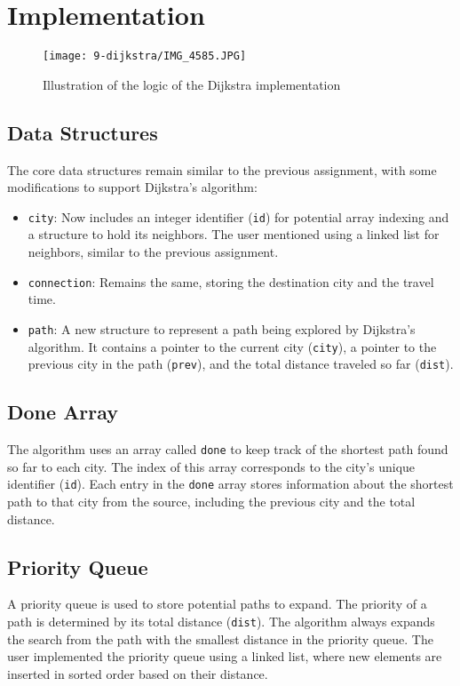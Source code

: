\documentclass[a4paper,11pt]{article}
\begin{document}
\section*{Implementation}
\begin{figure}
    \centering
    \texttt{[image: 9-dijkstra/IMG\_4585.JPG]}
    \caption{Illustration of the logic of the Dijkstra implementation}
    \label{fig:dijkstra}
\end{figure}
\subsection*{Data Structures}
The core data structures remain similar to the previous assignment, with some modifications to support Dijkstra's algorithm:

\begin{itemize}
    \item \texttt{city}: Now includes an integer identifier (\texttt{id}) for potential array indexing and a structure to hold its neighbors. The user mentioned using a linked list for neighbors, similar to the previous assignment.
    \item \texttt{connection}: Remains the same, storing the destination city and the travel time.
    \item \texttt{path}: A new structure to represent a path being explored by Dijkstra's algorithm. It contains a pointer to the current city (\texttt{city}), a pointer to the previous city in the path (\texttt{prev}), and the total distance traveled so far (\texttt{dist}).
\end{itemize}

\subsection*{Done Array}
The algorithm uses an array called \texttt{done} to keep track of the shortest path found so far to each city. The index of this array corresponds to the city's unique identifier (\texttt{id}). Each entry in the \texttt{done} array stores information about the shortest path to that city from the source, including the previous city and the total distance.

\subsection*{Priority Queue}
A priority queue is used to store potential paths to expand. The priority of a path is determined by its total distance (\texttt{dist}). The algorithm always expands the search from the path with the smallest distance in the priority queue. The user implemented the priority queue using a linked list, where new elements are inserted in sorted order based on their distance.
\end{document}
